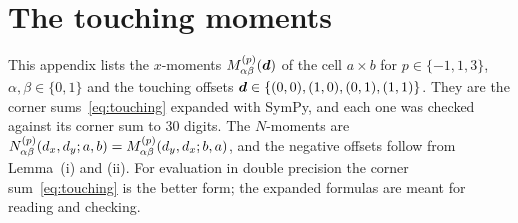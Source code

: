 \section{The touching moments}
\label{app:explicit}

This appendix lists the $x$-moments $M^{(p)}_{\alpha\beta}(\vb*{d})$ of the cell $a\times b$ for $p\in\{-1,1,3\}$,
$\alpha,\beta\in\{0,1\}$ and the touching offsets $\vb*{d}\in\{(0,0),(1,0),(0,1),(1,1)\}$. They are the corner
sums~\eqref{eq:touching} expanded with SymPy, and each one was checked against its corner sum to 30 digits. The
$N$-moments are $N^{(p)}_{\alpha\beta}(d_x,d_y;a,b)=M^{(p)}_{\alpha\beta}(d_y,d_x;b,a)$, and the negative offsets follow
from Lemma~(i) and (ii). For evaluation in double precision the corner sum~\eqref{eq:touching} is
the better form; the expanded formulas are meant for reading and checking.


